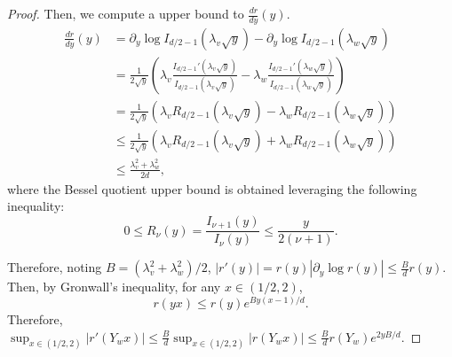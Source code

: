 \documentclass{article}
\theoremstyle{plain}
\theoremstyle{definition}
\theoremstyle{remark}
\begin{document}
\begin{proof}
    Then, we compute a upper bound to $\frac{dr}{dy}(y)$.
    \begin{align*}
        \frac{dr}{dy}(y) &= \partial_y \log I_{d/2-1}(\lambda_v\sqrt{y})- \partial_y \log I_{d/2-1}(\lambda_w\sqrt{y})\\
        &= \frac{1}{2\sqrt{y}}\left(\lambda_v\frac{I_{d/2-1}'(\lambda_v\sqrt{y})}{I_{d/2-1}(\lambda_v\sqrt{y})} - \lambda_w\frac{I_{d/2-1}'(\lambda_w \sqrt{y})}{I_{d/2-1}(\lambda_w \sqrt{y})}\right)\\
        &= \frac{1}{2\sqrt{y}}\left(\lambda_vR_{d/2-1}(\lambda_v \sqrt{y}) - \lambda_wR_{d/2-1}(\lambda_w \sqrt{y})\right)\\
        &\leq \frac{1}{2\sqrt{y}}\left(\lambda_vR_{d/2-1}(\lambda_v \sqrt{y}) + \lambda_wR_{d/2-1}(\lambda_w \sqrt{y})\right)\\
        &\leq \frac{\lambda_v^2+ \lambda_w^2}{2d},
    \end{align*}
    where the Bessel quotient upper bound is obtained leveraging the following inequality:
    \[ 0 \leq R_{\nu}(y) =\frac{I_{\nu+1}(y)}{I
    _{\nu}(y)} \leq \frac{y}{2(\nu+1)}.\]


    Therefore, noting $B = (\lambda_v^2 + \lambda_w^2)/2$, $|r'(y)| = r(y) |\partial_y \log r(y) | \leq \frac{B}{d} r(y)$. Then, by Gronwall's inequality, for any $x \in (1/2,2)$, 
    \[r(yx) \leq r(y) e^{B y (x-1)/d}.\]
    Therefore, $\sup_{x \in (1/2,2)} |r'(Y_w x)| \leq \frac{B}{d} \sup_{x \in (1/2,2)} |r(Y_w x)| \leq \frac{B}{d} r(Y_w) e^{2yB/d}$.
    

\end{proof}
\end{document}
